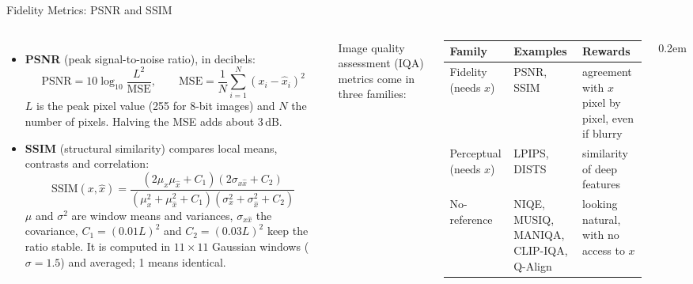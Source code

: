 \begin{frame}{Fidelity Metrics: PSNR and SSIM}
  \begin{columns}[T,onlytextwidth]
      \begin{itemize}\footnotesize\itemsep0.3em
        \item \textbf{PSNR} (peak signal-to-noise ratio), in decibels:
        \[ \mathrm{PSNR} = 10 \log_{10} \frac{L^2}{\mathrm{MSE}}, \qquad \mathrm{MSE} = \frac{1}{N}\sum_{i=1}^{N} (x_i - \hat{x}_i)^2 \]
        $L$ is the peak pixel value (255 for 8-bit images) and $N$ the number of pixels. Halving the MSE adds about 3\,dB.
        \item \textbf{SSIM} (structural similarity) compares local means, contrasts and correlation:
        \[ \mathrm{SSIM}(x,\hat{x}) = \frac{(2\mu_x\mu_{\hat{x}} + C_1)(2\sigma_{x\hat{x}} + C_2)}{(\mu_x^2+\mu_{\hat{x}}^2+C_1)(\sigma_x^2+\sigma_{\hat{x}}^2+C_2)} \]
        $\mu$ and $\sigma^2$ are window means and variances, $\sigma_{x\hat{x}}$ the covariance, $C_1 = (0.01L)^2$ and $C_2 = (0.03L)^2$ keep the ratio stable. It is computed in $11 \times 11$ Gaussian windows ($\sigma = 1.5$) and averaged; 1 means identical.
      \end{itemize}
      {\footnotesize Image quality assessment (IQA) metrics come in three families:\par}
      \vspace{0.3em}
      {\centering\scriptsize\setlength{\tabcolsep}{3pt}
      \begin{tabular}{>{\raggedright\arraybackslash}p{1.35cm} >{\raggedright\arraybackslash}p{1.85cm} >{\raggedright\arraybackslash}p{2.25cm}}
        \toprule
        \textbf{Family} & \textbf{Examples} & \textbf{Rewards} \\
        \midrule
        Fidelity (needs $x$) & PSNR, SSIM & agreement with $x$ pixel by pixel, even if blurry \\
        \addlinespace[0.2em]
        Perceptual (needs $x$) & LPIPS, DISTS & similarity of deep features \\
        \addlinespace[0.2em]
        No-reference & NIQE, MUSIQ, MANIQA, CLIP-IQA, Q-Align & looking natural, with no access to $x$ \\
        \bottomrule
      \end{tabular}\par}
      \vspace{0.3em}
      \begin{itemize}\scriptsize\itemsep0.2em

\end{itemize}
\end{columns}
\end{frame}
